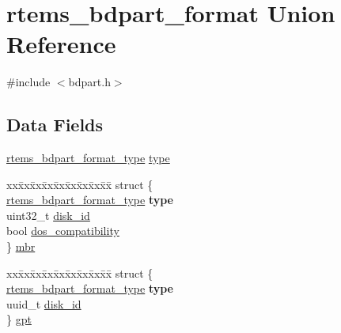 \hypertarget{unionrtems__bdpart__format}{}\section{rtems\+\_\+bdpart\+\_\+format Union Reference}
\label{unionrtems__bdpart__format}


{\ttfamily \#include $<$bdpart.\+h$>$}

\subsection*{Data Fields}
\begin{DoxyCompactItemize}
\item 
\mbox{\hyperlink{group__rtems__bdpart_ga688bdae263560502610c958bd45ff8af}{rtems\+\_\+bdpart\+\_\+format\+\_\+type}} \mbox{\hyperlink{unionrtems__bdpart__format_af88b7d18ad0fe9d134c6dbf03c63e1e7}{type}}
\item 
\begin{tabbing}
xx\=xx\=xx\=xx\=xx\=xx\=xx\=xx\=xx\=\kill
struct \{\\
\>\mbox{\hyperlink{group__rtems__bdpart_ga688bdae263560502610c958bd45ff8af}{rtems\_bdpart\_format\_type}} {\bfseries type}\\
\>uint32\_t \mbox{\hyperlink{unionrtems__bdpart__format_a6848b6efeef0fef443c036d8d7f4ca6f}{disk\_id}}\\
\>bool \mbox{\hyperlink{unionrtems__bdpart__format_ad484eba877bd3735a2e5a719be3d210f}{dos\_compatibility}}\\
\} \mbox{\hyperlink{unionrtems__bdpart__format_adf975df369c624fc9167d2a3de57f370}{mbr}}\\

\end{tabbing}\item 
\begin{tabbing}
xx\=xx\=xx\=xx\=xx\=xx\=xx\=xx\=xx\=\kill
struct \{\\
\>\mbox{\hyperlink{group__rtems__bdpart_ga688bdae263560502610c958bd45ff8af}{rtems\_bdpart\_format\_type}} {\bfseries type}\\
\>uuid\_t \mbox{\hyperlink{unionrtems__bdpart__format_abe68071c6e15d8f67eb888036ed64f60}{disk\_id}}\\
\} \mbox{\hyperlink{unionrtems__bdpart__format_ae9ba5ea27ab8373f76d113cbaeb99cb0}{gpt}}\\

\end{tabbing}\end{DoxyCompactItemize}


